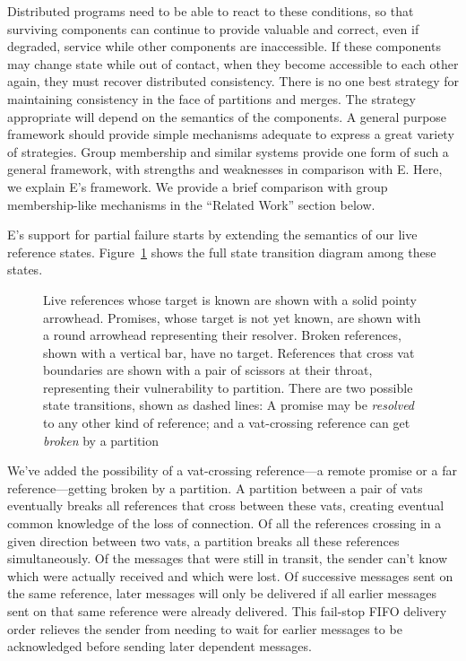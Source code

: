 \documentclass{llncs}
\begin{document}
Distributed programs need to be able to react to these conditions, so
that surviving components can continue to provide valuable and
correct, even if degraded, service while other components are
inaccessible. If these components may change state while out of
contact, when they become accessible to each other again, they must
recover distributed consistency. There is no one best strategy for
maintaining consistency in the face of partitions and merges. The
strategy appropriate will depend on the semantics of the components. A
general purpose framework should provide simple mechanisms adequate to
express a great variety of strategies. Group membership and similar
systems provide one form of such a general framework, with strengths
and weaknesses in comparison with E. Here, we explain E's
framework. We provide a brief comparison with group membership-like
mechanisms in the ``Related Work'' section below.

E's support for partial failure starts by extending the semantics of
our live reference states. Figure~\ref{fig:refstates} shows the full
state transition diagram among these states.
%
\begin{figure}
\centerline{}
\caption{Live references whose target is known are shown with a solid
  pointy arrowhead. Promises, whose target is not yet known, are shown
  with a round arrowhead representing their resolver. Broken
  references, shown with a vertical bar, have no target. References
  that cross vat boundaries are shown with a pair of scissors at their
  throat, representing their vulnerability to partition. There are two
  possible state transitions, shown as dashed lines: A promise may be
  \emph{resolved} to any other kind of reference; and a vat-crossing
  reference can get \emph{broken} by a partition}
\label{fig:refstates}
\end{figure}
%
We've added the possibility of a vat-crossing reference---a remote
promise or a far reference---getting broken by a partition. A
partition between a pair of vats eventually breaks all references that
cross between these vats, creating eventual common knowledge of the
loss of connection. Of all the references crossing in a given
direction between two vats, a partition breaks all these references
simultaneously. Of the messages that were still in transit, the sender
can't know which were actually received and which were lost. Of
successive messages sent on the same reference, later messages will
only be delivered if all earlier messages sent on that same reference
were already delivered. This fail-stop FIFO delivery order relieves
the sender from needing to wait for earlier messages to be
acknowledged before sending later dependent messages.
\end{document}
